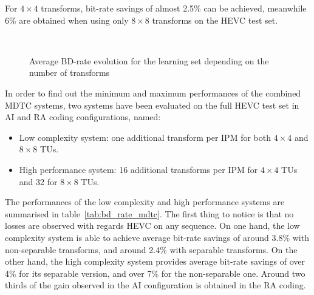 \documentclass[11pt,a4paper,openright,twoside]{book}
\numberwithin{equation}{section} %
\numberwithin{figure}{section} %
\numberwithin{table}{section} %
\begin{document}
For $4\times4$ transforms, bit-rate savings of almost 2.5\% can be achieved,
meanwhile 6\% are obtained when using only $8\times8$ transforms on the
\ac{HEVC} test set.

\begin{figure}[tb]
	\centering
	\\
	\caption{Average \acs{BD}-rate evolution for the learning set depending
	on the number of transforms}
	\label{fig:mdtc_bdrate_ntransforms}
\end{figure}

In order to find out the minimum and maximum performances of the combined
\ac{MDTC} systems, two systems have been evaluated on the full \ac{HEVC} test
set in \ac{AI} and \ac{RA} coding configurations, named:
\begin{itemize}
	\item Low complexity system: one additional transform per \ac{IPM}
		for both $4\times4$ and $8\times8$ \acp{TU}.
	\item High performance system: 16 additional transforms per \ac{IPM} for
		$4\times4$ \acp{TU} and 32 for $8\times8$ \acp{TU}.
\end{itemize}
The performances of the low complexity and high performance systems are
summarised in table~\ref{tab:bd_rate_mdtc}.
The first thing to notice is that no losses are observed with regards
\ac{HEVC} on any sequence.
On one hand, the low complexity system is able to achieve average bit-rate
savings of around 3.8\% with non-separable transforms, and around 2.4\% with
separable transforms.
On the other hand, the high complexity system provides average bit-rate
savings of over 4\% for its separable version, and over 7\% for the
non-separable one.
Around two thirds of the gain observed in the \ac{AI} configuration is
obtained in the \ac{RA} coding.
\end{document}
